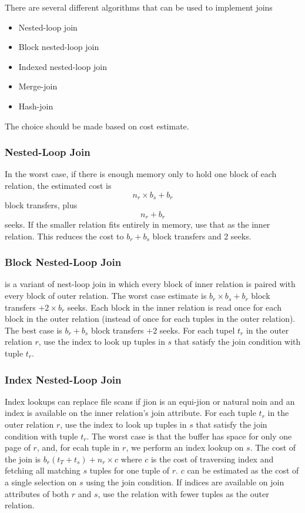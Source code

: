 \documentclass{article}
\begin{document}
There are several different algorithms that can be used to implement joins 
\begin{itemize}
  \item Nested-loop join 
  \item Block nested-loop join 
  \item Indexed nested-loop join 
  \item Merge-join 
  \item Hash-join
\end{itemize}
The choice should be made based on cost estimate. \\ 

\subsubsection{Nested-Loop Join}

In the worst case, if there is enough memory only to hold one block of each relation, the estimated cost is $$n_r \times b_s + b_r$$ block transfers, plus $$n_r + b_r$$ seeks. If the smaller relation fits entirely in memory, use that as the inner relation. This reduces the cost to $b_r + b_s$ block transfers and 2 seeks. \\ 

\subsubsection{Block Nested-Loop Join}

 is a variant of nest-loop join in which every block of inner relation is paired with every block of outer relation. The worst case estimate is $b_r \times b_s + b_r$ block transfers $+ 2 \times b_r$ seeks. Each block in the inner relation is read once for each block in the outer relation (instead of once for each tuples in the outer relation). The best case is $b_r + b_s$ block transfers $+ 2$ seeks. For each tupel $t_r$ in the outer relation $r$, use the index to look up tuples in $s$ that satisfy the join condition with tuple $t_r$. 

\subsubsection{Index Nested-Loop Join}

Index lookups can replace file scans if jion is an equi-jion or natural noin and an index is available on the inner relation's join attribute. For each tuple $t_r$ in the outer relation $r$, use the index to look up tuples in $s$ that satisfy the join condition with tuple $t_r$. The worst case is that the buffer has space for only one page of $r$, and, for ecah tuple in $r$, we perform an index lookup on $s$. The cost of the join is $b_r (t_T + t_s) + n_r \times c$ where $c$ is the cost of traversing index and fetching all matching $s$ tuples for one tuple of $r$. $c$ can be estimated as the cost of a single selection on $s$ using the join condition. If indices are available on join attributes of both $r$ and $s$, use the relation with fewer tuples as the outer relation. 
\end{document}
